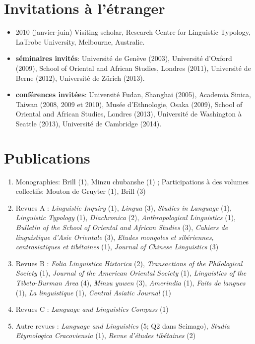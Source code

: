 \documentclass[oldfontcommands,oneside,a4paper,11pt]{article}
\begin{document}
\section*{Invitations à l'étranger}
\begin{itemize}
\item   2010 (janvier-juin) Visiting scholar, Research Centre for Linguistic Typology, LaTrobe University, Melbourne, Australie.
 \item   \textbf{séminaires invités}:  Université de Genève (2003),  Université d'Oxford (2009), School of Oriental and African Studies, Londres (2011), Université de Berne (2012),  Université de Zürich (2013).
 \item \textbf{conférences invitées}: Université Fudan, Shanghai (2005), Academia Sinica, Taiwan (2008, 2009 et 2010), Musée d'Ethnologie, Osaka (2009), School of Oriental and African Studies, Londres (2013), Université de Washington à Seattle (2013),  Université de Cambridge (2014).
  \end{itemize}
    
\section*{Publications}

    \begin{enumerate}
    \item Monographies: Brill (1), Minzu chubanshe (1) ; Participations à des volumes collectifs: Mouton de Gruyter (1), Brill (3)
\item Revues A : \textit{Linguistic Inquiry} (1), \textit{Lingua} (3), \textit{Studies in Language} (1), \textit{Linguistic Typology} (1), \textit{Diachronica} (2), \textit{Anthropological Linguistics} (1), \textit{Bulletin of the School of Oriental and African Studies} (3),  \textit{Cahiers de linguistique d’Asie Orientale} (3), \textit{Etudes mongoles et sibériennes, centrasiatiques et tibétaines} (1), \textit{Journal of Chinese Linguistics} (3)
\item Revues B : \textit{Folia Linguistica Historica} (2), \textit{Transactions of the Philological Society} (1), \textit{Journal of the American Oriental Society} (1), \textit{Linguistics of the Tibeto-Burman Area} (4), \textit{Minzu yuwen} (3), \textit{Amerindia} (1), \textit{Faits de langues} (1), \textit{La linguistique} (1), \textit{Central Asiatic Journal} (1)
\item Revues C : \textit{Language and Linguistics Compass} (1) 
\item Autre revues :   \textit{Language and Linguistics} (5; Q2 dans Scimago),   \textit{Studia Etymologica Cracoviensia} (1), \textit{Revue d'études tibétaines} (2)
\end{enumerate}
\end{document}
